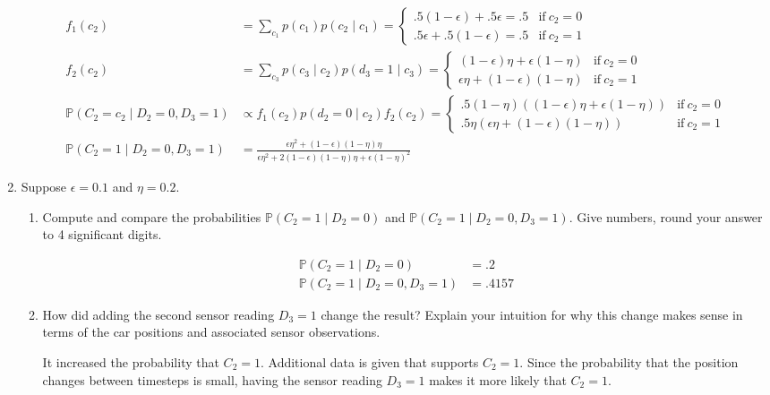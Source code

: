 \documentclass[10pt]{article}
\begin{document}
\begin{enumerate}[label=(\alph*)]
	\begin{align*}
	f_1(c_2) &= \sum_{c_1} p(c_1) p(c_2 \mid c_1) = \begin{cases}
	.5 (1 - \epsilon) + .5\epsilon = .5 &\text{if} \ c_2 = 0\\
	.5 \epsilon + .5 (1 - \epsilon) = .5 &\text{if} \ c_2 = 1
	\end{cases}\\
	f_2(c_2) &= \sum_{c_3} p(c_3 \mid c_2) p(d_3 = 1 \mid c_3) = \begin{cases}
	(1 - \epsilon)\eta + \epsilon(1 - \eta) &\text{if} \ c_2 = 0\\
	\epsilon\eta + (1 - \epsilon)(1 - \eta) &\text{if} \ c_2 = 1
	\end{cases}\\
	\mathbb{P}(C_2 = c_2 \mid D_2 = 0, D_3 = 1) &\propto f_1(c_2) p(d_2 = 0 \mid c_2) f_2(c_2) = \begin{cases}
	.5(1 - \eta)((1 - \epsilon)\eta + \epsilon(1 - \eta)) &\text{if} \ c_2 = 0\\
	.5\eta(\epsilon\eta + (1 - \epsilon)(1 - \eta)) &\text{if} \ c_2 = 1
	\end{cases}\\
	\mathbb{P}(C_2 = 1 \mid D_2 = 0, D_3 = 1) &= \frac{\epsilon\eta^2 + (1 - \epsilon)(1 - \eta)\eta}{\epsilon\eta^2 + 2(1 - \epsilon)(1 - \eta)\eta + \epsilon(1 - \eta)^2}
	\end{align*}
		
	\item Suppose $\epsilon = 0.1$ and $\eta = 0.2$.
	\begin{enumerate}[label=(\roman*)]
		\item Compute and compare the probabilities $\mathbb{P}(C_2 = 1 \mid D_2 = 0)$ and $\mathbb{P}(C_2 = 1 \mid D_2 = 0, D_3 = 1)$. Give numbers, round your answer to 4 significant digits.
		
		\begin{align*}
		\mathbb{P}(C_2 = 1 \mid D_2 = 0) &= .2\\
		\mathbb{P}(C_2 = 1 \mid D_2 = 0, D_3 = 1) &= .4157
		\end{align*}
		
		\item How did adding the second sensor reading $D_3 = 1$ change the result? Explain your intuition for why this change makes sense in terms of the car positions and associated sensor observations.
		
		It increased the probability that $C_2 = 1$. Additional data is given that supports $C_2 = 1$. Since the probability that the position changes between timesteps is small, having the sensor reading $D_3 = 1$ makes it more likely that $C_2 = 1$. 
		

\end{enumerate}
\end{enumerate}
\end{document}
